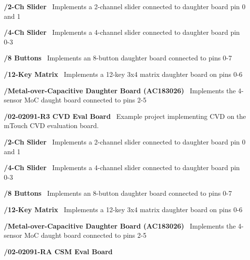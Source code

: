 \begin{DoxyItemize}
\begin{DoxyItemize}
\begin{DoxyItemize}
\begin{DoxyItemize}
\item {\bfseries /2-\/\+Ch Slider}~\newline
 Implements a 2-\/channel slider connected to daughter board pin 0 and 1 
\item {\bfseries /4-\/\+Ch Slider}~\newline
 Implements a 4-\/channel slider connected to daughter board pin 0-\/3 
\item {\bfseries /8 Buttons}~\newline
 Implements an 8-\/button daughter board connected to pins 0-\/7 
\item {\bfseries /12-\/\+Key Matrix}~\newline
 Implements a 12-\/key 3x4 matrix daughter board on pins 0-\/6 
\item {\bfseries /\+Metal-\/over-\/\+Capacitive Daughter Board (A\+C183026)}~\newline
 Implements the 4-\/sensor Mo\+C daught board connected to pins 2-\/5 
\end{DoxyItemize}
\item {\bfseries /02-\/02091-\/\+R3 C\+V\+D Eval Board}~\newline
 Example project implementing C\+V\+D on the m\+Touch C\+V\+D evaluation board. 
\begin{DoxyItemize}
\item {\bfseries /2-\/\+Ch Slider}~\newline
 Implements a 2-\/channel slider connected to daughter board pin 0 and 1 
\item {\bfseries /4-\/\+Ch Slider}~\newline
 Implements a 4-\/channel slider connected to daughter board pin 0-\/3 
\item {\bfseries /8 Buttons}~\newline
 Implements an 8-\/button daughter board connected to pins 0-\/7 
\item {\bfseries /12-\/\+Key Matrix}~\newline
 Implements a 12-\/key 3x4 matrix daughter board on pins 0-\/6 
\item {\bfseries /\+Metal-\/over-\/\+Capacitive Daughter Board (A\+C183026)}~\newline
 Implements the 4-\/sensor Mo\+C daught board connected to pins 2-\/5 
\end{DoxyItemize}
\item {\bfseries /02-\/02091-\/\+R\+A C\+S\+M Eval Board}~\newline

\end{DoxyItemize}
\end{DoxyItemize}
\end{DoxyItemize}
